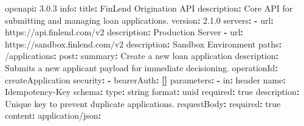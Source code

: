 \documentclass[
  11pt,
  openany,
  oneside]{book}
\newenvironment{Shaded}{}{}
\newcommand{\AttributeTok}[1]{\textcolor[rgb]{0.49,0.56,0.16}{#1}}
\newcommand{\CharTok}[1]{\textcolor[rgb]{0.25,0.44,0.63}{#1}}
\newcommand{\FloatTok}[1]{\textcolor[rgb]{0.25,0.63,0.44}{#1}}
\newcommand{\FunctionTok}[1]{\textcolor[rgb]{0.02,0.16,0.49}{#1}}
\newcommand{\KeywordTok}[1]{\textcolor[rgb]{0.00,0.44,0.13}{\textbf{#1}}}
\begin{document}
\begin{Shaded}
\begin{Highlighting}[]
\FunctionTok{openapi}\KeywordTok{:}\AttributeTok{ }\FloatTok{3.0.3}
\FunctionTok{info}\KeywordTok{:}
\AttributeTok{  }\FunctionTok{title}\KeywordTok{:}\AttributeTok{ FinLend Origination API}
\AttributeTok{  }\FunctionTok{description}\KeywordTok{:}\AttributeTok{ Core API for submitting and managing loan applications.}
\AttributeTok{  }\FunctionTok{version}\KeywordTok{:}\AttributeTok{ }\FloatTok{2.1.0}
\FunctionTok{servers}\KeywordTok{:}
\AttributeTok{  }\KeywordTok{{-}}\AttributeTok{ }\FunctionTok{url}\KeywordTok{:}\AttributeTok{ https://api.finlend.com/v2}
\AttributeTok{    }\FunctionTok{description}\KeywordTok{:}\AttributeTok{ Production Server}
\AttributeTok{  }\KeywordTok{{-}}\AttributeTok{ }\FunctionTok{url}\KeywordTok{:}\AttributeTok{ https://sandbox.finlend.com/v2}
\AttributeTok{    }\FunctionTok{description}\KeywordTok{:}\AttributeTok{ Sandbox Environment}
\FunctionTok{paths}\KeywordTok{:}
\AttributeTok{  }\FunctionTok{/applications}\KeywordTok{:}
\AttributeTok{    }\FunctionTok{post}\KeywordTok{:}
\AttributeTok{      }\FunctionTok{summary}\KeywordTok{:}\AttributeTok{ Create a new loan application}
\AttributeTok{      }\FunctionTok{description}\KeywordTok{:}\AttributeTok{ Submits a new applicant payload for immediate decisioning.}
\AttributeTok{      }\FunctionTok{operationId}\KeywordTok{:}\AttributeTok{ createApplication}
\AttributeTok{      }\FunctionTok{security}\KeywordTok{:}
\AttributeTok{        }\KeywordTok{{-}}\AttributeTok{ }\FunctionTok{bearerAuth}\KeywordTok{:}\AttributeTok{ }\KeywordTok{[]}
\AttributeTok{      }\FunctionTok{parameters}\KeywordTok{:}
\AttributeTok{        }\KeywordTok{{-}}\AttributeTok{ }\FunctionTok{in}\KeywordTok{:}\AttributeTok{ header}
\AttributeTok{          }\FunctionTok{name}\KeywordTok{:}\AttributeTok{ Idempotency{-}Key}
\AttributeTok{          }\FunctionTok{schema}\KeywordTok{:}
\AttributeTok{            }\FunctionTok{type}\KeywordTok{:}\AttributeTok{ string}
\AttributeTok{            }\FunctionTok{format}\KeywordTok{:}\AttributeTok{ uuid}
\AttributeTok{          }\FunctionTok{required}\KeywordTok{:}\AttributeTok{ }\CharTok{true}
\AttributeTok{          }\FunctionTok{description}\KeywordTok{:}\AttributeTok{ Unique key to prevent duplicate applications.}
\AttributeTok{      }\FunctionTok{requestBody}\KeywordTok{:}
\AttributeTok{        }\FunctionTok{required}\KeywordTok{:}\AttributeTok{ }\CharTok{true}
\AttributeTok{        }\FunctionTok{content}\KeywordTok{:}
\AttributeTok{          }\FunctionTok{application/json}\KeywordTok{:}

\end{Highlighting}
\end{Shaded}
\end{document}
